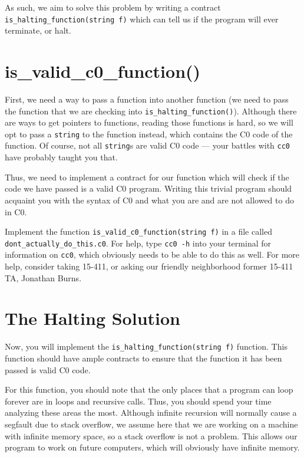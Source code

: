 \documentclass[12pt]{exam}
\begin{document}
As such, we aim to solve this problem by writing a contract \texttt{is\_halting\_function(string f)} which can tell us if the program will ever terminate, or halt.

\section{is\_valid\_c0\_function()}

First, we need a way to pass a function into another function (we need to pass the function that we are checking into \texttt{is\_halting\_function()}). Although there are ways to get pointers to functions, reading those functions is hard, so we will opt to pass a \texttt{string} to the function instead, which contains the C0 code of the function. Of course, not all \texttt{string}s are valid C0 code --- your battles with \texttt{cc0} have probably taught you that.

Thus, we need to implement a contract for our function which will check if the code we have passed is a valid C0 program. Writing this trivial program should acquaint you with the syntax of C0 and what you are and are not allowed to do in C0.

\begin{task}[10] Implement the function \texttt{is\_valid\_c0\_function(string f)} in a file called \texttt{dont\_actually\_do\_this.c0}. For help, type \texttt{cc0 -h} into your terminal for information on \texttt{cc0}, which obviously needs to be able to do this as well. For more help, consider taking 15-411, or asking our friendly neighborhood former 15-411 TA, Jonathan Burns.
\end{task}


\section{The Halting Solution}

Now, you will implement the \texttt{is\_halting\_function(string f)} function. This function should have ample contracts to ensure that the function it has been passed is valid C0 code.

For this function, you should note that the only places that a program can loop forever are in loops and recursive calls. Thus, you should spend your time analyzing these areas the most. Although infinite recursion will normally cause a segfault due to stack overflow, we assume here that we are working on a machine with infinite memory space, so a stack overflow is not a problem. This allows our program to work on future computers, which will obviously have infinite memory.
\end{document}
